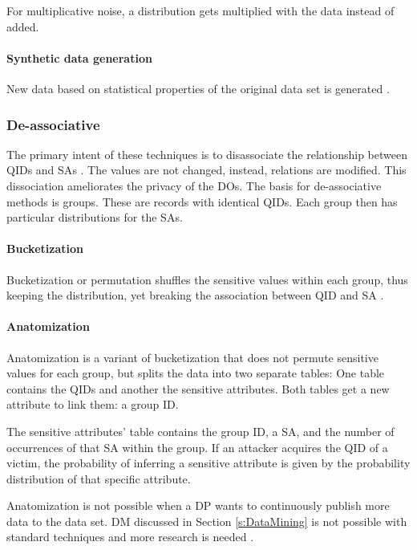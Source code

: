        For multiplicative noise, a distribution gets multiplied with the data instead of added.
        
        \paragraph{Synthetic data generation}
        \label{s:SyntheticDataGeneration}

        New data based on statistical properties of the original data set is generated \cite{Fung2010}.

    \subsubsection{De-associative}

    The primary intent of these techniques is to disassociate the relationship between \gls{QID}s and \gls{SA}s 
    \cite{Fung2010, Lu2021}.
    The values are not changed, instead, relations are modified.
    This dissociation ameliorates the privacy of the \gls{DO}s.
    The basis for de-associative methods is groups. 
    These are records with identical \gls{QID}s.
    Each group then has particular distributions for the \gls{SA}s.

        \paragraph{Bucketization}

        Bucketization or permutation shuffles the sensitive values within each group,
		  thus keeping the distribution, yet breaking the association between \gls{QID} and \gls{SA} \cite{Fung2010}.

        \paragraph{Anatomization}

        Anatomization is a variant of bucketization that does not permute sensitive values for each group, but splits the data into two separate tables: 
        One table contains the \gls{QID}s and another the sensitive attributes.
        Both tables get a new attribute to link them: a group ID.

        The sensitive attributes' table contains the group ID, a \gls{SA}, and the number of occurrences of that \gls{SA} within the group.
        If an attacker acquires the \gls{QID} of a victim, the probability of inferring a sensitive attribute is given by the probability distribution of that specific attribute.
    
        Anatomization is not possible when a \gls{DP} wants to continuously publish more data to the data set.
        \gls{DM} discussed in Section \ref{s:DataMining} is not possible with standard techniques and more research is needed \cite{Fung2010}.

